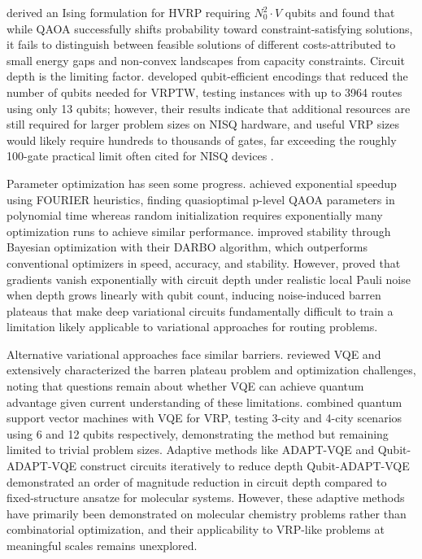 \documentclass[preprint,3p,12pt,authoryear]{elsarticle}
\begin{document}
\citet{fitzek2024applying} derived an Ising formulation for HVRP requiring $N_0^2 \cdot V$ qubits and found that while QAOA successfully shifts probability toward constraint-satisfying solutions, it fails to distinguish between feasible solutions of different costs-attributed to small energy gaps and non-convex landscapes from capacity constraints. Circuit depth is the limiting factor. \cite{leonidas2023qubit} developed qubit-efficient encodings that reduced the number of qubits needed for VRPTW, testing instances with up to 3964 routes using only 13 qubits; however, their results indicate that additional resources are still required for larger problem sizes on NISQ hardware, and useful VRP sizes would likely require hundreds to thousands of gates, far exceeding the roughly 100-gate practical limit often cited for NISQ devices \cite{preskill2018quantum}.

Parameter optimization has seen some progress. \cite{zhou2020quantum} achieved exponential speedup using FOURIER heuristics, finding quasioptimal p-level QAOA parameters in polynomial time whereas random initialization requires exponentially many optimization runs to achieve similar performance. \cite{cheng2024quantum} improved stability through Bayesian optimization with their DARBO algorithm, which outperforms conventional optimizers in speed, accuracy, and stability. However, \cite{wang2021noise} proved that gradients vanish exponentially with circuit depth under realistic local Pauli noise when depth grows linearly with qubit count, inducing noise-induced barren plateaus that make deep variational circuits fundamentally difficult to train a limitation likely applicable to variational approaches for routing problems.

Alternative variational approaches face similar barriers. \cite{tilly2022variational} reviewed VQE and extensively characterized the barren plateau problem and optimization challenges, noting that questions remain about whether VQE can achieve quantum advantage given current understanding of these limitations. \cite{mohanty2024solving} combined quantum support vector machines with VQE for VRP, testing 3-city and 4-city scenarios using 6 and 12 qubits respectively, demonstrating the method but remaining limited to trivial problem sizes. 
Adaptive methods like ADAPT-VQE \cite{grimsley2019adaptive} and Qubit-ADAPT-VQE \cite{tang2021qubit} construct circuits iteratively to reduce depth Qubit-ADAPT-VQE demonstrated an order of magnitude reduction in circuit depth compared to fixed-structure ansatze for molecular systems. However, these adaptive methods have primarily been demonstrated on molecular chemistry problems rather than combinatorial optimization, and 
their applicability to VRP-like problems at meaningful scales remains unexplored.
\end{document}

